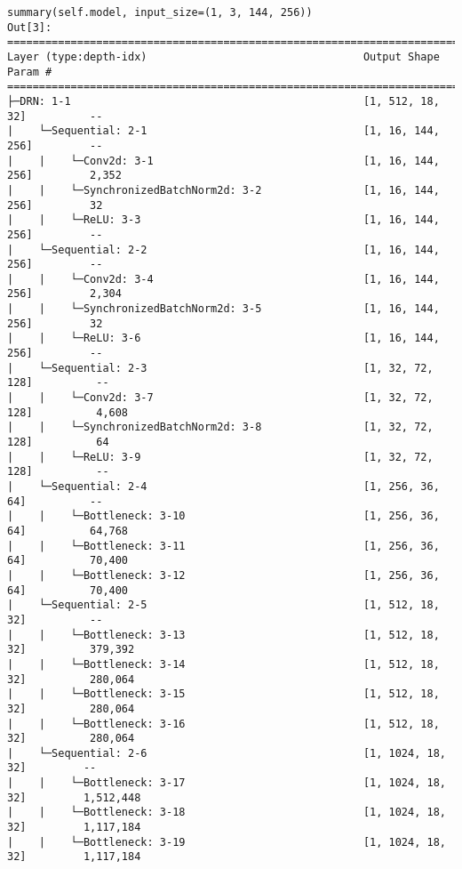\begin{verbatim}
summary(self.model, input_size=(1, 3, 144, 256))
Out[3]: 
=========================================================================================================
Layer (type:depth-idx)                                  Output Shape              Param #
=========================================================================================================
├─DRN: 1-1                                              [1, 512, 18, 32]          --
|    └─Sequential: 2-1                                  [1, 16, 144, 256]         --
|    |    └─Conv2d: 3-1                                 [1, 16, 144, 256]         2,352
|    |    └─SynchronizedBatchNorm2d: 3-2                [1, 16, 144, 256]         32
|    |    └─ReLU: 3-3                                   [1, 16, 144, 256]         --
|    └─Sequential: 2-2                                  [1, 16, 144, 256]         --
|    |    └─Conv2d: 3-4                                 [1, 16, 144, 256]         2,304
|    |    └─SynchronizedBatchNorm2d: 3-5                [1, 16, 144, 256]         32
|    |    └─ReLU: 3-6                                   [1, 16, 144, 256]         --
|    └─Sequential: 2-3                                  [1, 32, 72, 128]          --
|    |    └─Conv2d: 3-7                                 [1, 32, 72, 128]          4,608
|    |    └─SynchronizedBatchNorm2d: 3-8                [1, 32, 72, 128]          64
|    |    └─ReLU: 3-9                                   [1, 32, 72, 128]          --
|    └─Sequential: 2-4                                  [1, 256, 36, 64]          --
|    |    └─Bottleneck: 3-10                            [1, 256, 36, 64]          64,768
|    |    └─Bottleneck: 3-11                            [1, 256, 36, 64]          70,400
|    |    └─Bottleneck: 3-12                            [1, 256, 36, 64]          70,400
|    └─Sequential: 2-5                                  [1, 512, 18, 32]          --
|    |    └─Bottleneck: 3-13                            [1, 512, 18, 32]          379,392
|    |    └─Bottleneck: 3-14                            [1, 512, 18, 32]          280,064
|    |    └─Bottleneck: 3-15                            [1, 512, 18, 32]          280,064
|    |    └─Bottleneck: 3-16                            [1, 512, 18, 32]          280,064
|    └─Sequential: 2-6                                  [1, 1024, 18, 32]         --
|    |    └─Bottleneck: 3-17                            [1, 1024, 18, 32]         1,512,448
|    |    └─Bottleneck: 3-18                            [1, 1024, 18, 32]         1,117,184
|    |    └─Bottleneck: 3-19                            [1, 1024, 18, 32]         1,117,184

\end{verbatim}
